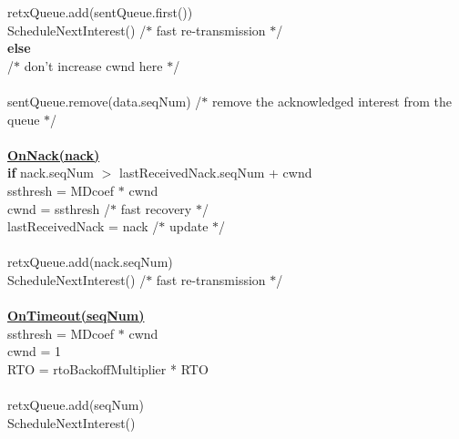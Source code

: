 \documentclass[10pt]{article}
\begin{document}
\begin{mdframed}
  \-\hspace{3em} retxQueue.add(sentQueue.first())\\
  \-\hspace{3em} ScheduleNextInterest() /$*$ fast re-transmission $*$/\\
  \-\hspace{2em} \textbf{else}\\
  \-\hspace{3em} /$*$ don't increase cwnd here $*$/ \\\\
  \-\hspace{1em} sentQueue.remove(data.seqNum) /$*$ remove the
  acknowledged interest from the queue $*$/\\\\
  \underline{\textbf{OnNack(nack)}} \\
  \-\hspace{1em} \textbf{if} nack.seqNum $>$ lastReceivedNack.seqNum +
  cwnd\\
  \-\hspace{2em} ssthresh =  MDcoef $*$ cwnd\\
  \-\hspace{2em} cwnd = ssthresh /$*$ fast recovery $*$/ \\
  \-\hspace{2em} lastReceivedNack = nack /$*$ update $*$/ \\\\
  \-\hspace{1em} retxQueue.add(nack.seqNum)\\
  \-\hspace{1em} ScheduleNextInterest() /$*$ fast re-transmission $*$/\\\\
  \underline{\textbf{OnTimeout(seqNum)}} \\
  \-\hspace{1em} ssthresh =  MDcoef $*$ cwnd\\
  \-\hspace{1em} cwnd = 1\\
  \-\hspace{1em} RTO = rtoBackoffMultiplier * RTO\\\\
  \-\hspace{1em} retxQueue.add(seqNum)\\
  \-\hspace{1em} ScheduleNextInterest()
\end{mdframed}
\end{document}
